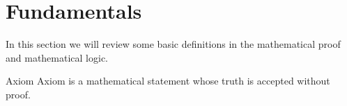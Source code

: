 \section{Fundamentals}
In this section we will review some basic definitions in the mathematical proof and mathematical logic.

\begin{defbox}{Axiom}
	Axiom is a mathematical statement whose truth is accepted without proof.
\end{defbox}